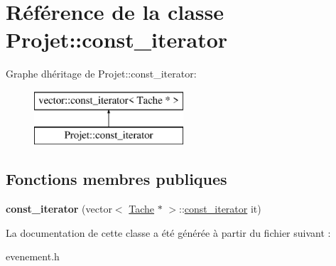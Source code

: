 \hypertarget{class_projet_1_1const__iterator}{}\section{Référence de la classe Projet\+:\+:const\+\_\+iterator}
\label{class_projet_1_1const__iterator}
Graphe d\textquotesingle{}héritage de Projet\+:\+:const\+\_\+iterator\+:\begin{figure}[H]
\begin{center}
\leavevmode
\includegraphics[height=2.000000cm]{class_projet_1_1const__iterator}
\end{center}
\end{figure}
\subsection*{Fonctions membres publiques}
\begin{DoxyCompactItemize}
\item 
\hypertarget{class_projet_1_1const__iterator_adec014c18cd3419ac3302c9a47dd88e2}{}{\bfseries const\+\_\+iterator} (vector$<$ \hyperlink{class_tache}{Tache} $\ast$ $>$\+::\hyperlink{class_projet_1_1const__iterator}{const\+\_\+iterator} it)\label{class_projet_1_1const__iterator_adec014c18cd3419ac3302c9a47dd88e2}

\end{DoxyCompactItemize}


La documentation de cette classe a été générée à partir du fichier suivant \+:\begin{DoxyCompactItemize}
\item 
evenement.\+h\end{DoxyCompactItemize}

